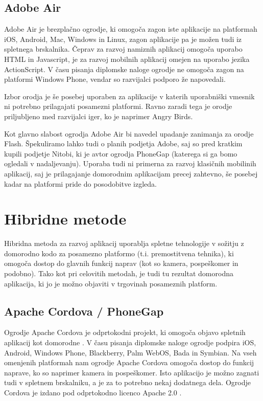 \subsection{Adobe Air}

Adobe Air\cite{adobeair} je brezplačno ogrodje, ki omogoča zagon iste aplikacije na platformah iOS, Android, Mac, Windows in Linux, zagon aplikacije pa je možen tudi iz spletnega brskalnika. Čeprav za razvoj namiznih aplikacij omogoča uporabo HTML in Javascript, je za razvoj mobilnih aplikacij omejen na uporabo jezika ActionScript. V času pisanja diplomske naloge ogrodje ne omogoča zagon na platformi Windows Phone, vendar so razvijalci podporo že napovedali.

Izbor orodja je še posebej uporaben za aplikacije v katerih uporabniški vmesnik ni potrebno prilagajati posamezni platformi. Ravno zaradi tega je orodje priljubljeno med razvijalci iger, ko je naprimer Angry Birds\cite{angrybirds}.

Kot glavno slabost ogrodja Adobe Air bi navedel upadanje zanimanja za orodje Flash. Špekuliramo lahko tudi o planih podjetja Adobe, saj so pred kratkim kupili podjetje Nitobi, ki je avtor ogrodja PhoneGap (katerega si ga bomo ogledali v nadaljevanju). Uporaba tudi ni primerna za razvoj klasičnih mobilinih aplikacij, saj je prilagajanje domorodnim aplikacijam precej zahtevno, še posebej kadar na platformi pride do posodobitve izgleda.

\section{Hibridne metode}

Hibridna metoda za razvoj aplikacij uporablja spletne tehnologije v sožitju z domorodno kodo za posamezno platformo (t.i. premostitvena tehnika), ki omogoča dostop do glavnih funkcij naprav (kot so kamera, pospeškomer in podobno). Tako kot pri celovitih metodah, je tudi tu rezultat domorodna aplikacija, ki jo je možno objaviti v trgovinah posameznih platform.

\subsection{Apache Cordova / PhoneGap}

Ogrodje Apache Cordova\cite{cordova} je odprtokodni projekt, ki omogoča objavo spletnih aplikacij kot domorodne \cite{web-vs-native}. V času pisanja diplomske naloge ogrodje podpira iOS, Android, Windows Phone, Blackberry, Palm WebOS, Bada in Symbian. Na vseh omenjenih platformah nam ogrodje Apache Cordova omogoča dostop do funkcij naprave, ko so naprimer kamera in pospeškomer. Isto aplikacijo je možno zagnati tudi v spletnem brskalniku, a je za to potrebno nekaj dodatnega dela. Ogrodje Cordova je izdano pod odprtokodno licenco Apache 2.0 \cite{apache-licence}.

